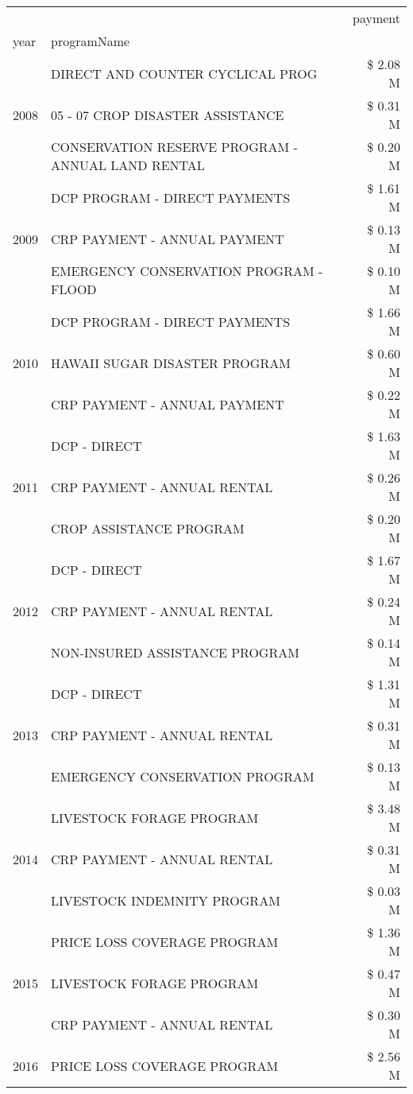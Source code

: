 \begin{tabular}{llr}
\toprule
 &  & payment \\
year & programName &  \\
\midrule
\multirow[t]{3}{*}{2008} & DIRECT AND COUNTER CYCLICAL PROG & \$ 2.08 M \\
 & 05 - 07 CROP DISASTER ASSISTANCE & \$ 0.31 M \\
 & CONSERVATION RESERVE PROGRAM - ANNUAL LAND RENTAL & \$ 0.20 M \\
\cline{1-3}
\multirow[t]{3}{*}{2009} & DCP PROGRAM - DIRECT PAYMENTS & \$ 1.61 M \\
 & CRP PAYMENT - ANNUAL PAYMENT & \$ 0.13 M \\
 & EMERGENCY CONSERVATION PROGRAM - FLOOD & \$ 0.10 M \\
\cline{1-3}
\multirow[t]{3}{*}{2010} & DCP PROGRAM - DIRECT PAYMENTS & \$ 1.66 M \\
 & HAWAII SUGAR DISASTER PROGRAM & \$ 0.60 M \\
 & CRP PAYMENT - ANNUAL PAYMENT & \$ 0.22 M \\
\cline{1-3}
\multirow[t]{3}{*}{2011} & DCP - DIRECT & \$ 1.63 M \\
 & CRP PAYMENT - ANNUAL RENTAL & \$ 0.26 M \\
 & CROP ASSISTANCE PROGRAM & \$ 0.20 M \\
\cline{1-3}
\multirow[t]{3}{*}{2012} & DCP - DIRECT & \$ 1.67 M \\
 & CRP PAYMENT - ANNUAL RENTAL & \$ 0.24 M \\
 & NON-INSURED ASSISTANCE PROGRAM & \$ 0.14 M \\
\cline{1-3}
\multirow[t]{3}{*}{2013} & DCP - DIRECT & \$ 1.31 M \\
 & CRP PAYMENT - ANNUAL RENTAL & \$ 0.31 M \\
 & EMERGENCY CONSERVATION PROGRAM & \$ 0.13 M \\
\cline{1-3}
\multirow[t]{3}{*}{2014} & LIVESTOCK FORAGE PROGRAM & \$ 3.48 M \\
 & CRP PAYMENT - ANNUAL RENTAL & \$ 0.31 M \\
 & LIVESTOCK INDEMNITY PROGRAM & \$ 0.03 M \\
\cline{1-3}
\multirow[t]{3}{*}{2015} & PRICE LOSS COVERAGE PROGRAM & \$ 1.36 M \\
 & LIVESTOCK FORAGE PROGRAM & \$ 0.47 M \\
 & CRP PAYMENT - ANNUAL RENTAL & \$ 0.30 M \\
\cline{1-3}
\multirow[t]{3}{*}{2016} & PRICE LOSS COVERAGE PROGRAM                   & \$ 2.56 M \\

\end{tabular}
